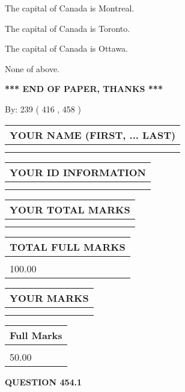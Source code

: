 \documentclass[12pt]{article}
\begin{document}
  
 
 
The capital of Canada is Montreal.
 
 
The capital of Canada is Toronto.
 
 
The capital of Canada is Ottawa.
 
 
 None of above.
 
 
   
   
\vspace{1.0in} 
{\textbf{\large{ *** END OF PAPER, THANKS *** }}} 
   
   
\hspace{1.0in} By: 
 239 ( 416 ,  458 )
   
   
   
   
\newpage 
\setcounter{page}{ 
   454001 } 
   
   
   
   
\noindent\begin{tabular}{|l|}
\hline
YOUR NAME (FIRST, ... LAST)  \\
\hline
 \\ 
 \\ 
\hline
\end{tabular}
\hspace{0.05in} \begin{tabular}{|l|}
\hline
 YOUR   ID   INFORMATION  \\
\hline
 \\ 
 \\ 
\hline
\end{tabular}
   
   
\vspace{0.2in}\noindent\begin{tabular}{|l|}
\hline
YOUR TOTAL MARKS  \\
\hline
 \\ 
 \\ 
\hline
\end{tabular}
\hspace{0.05in} \begin{tabular}{|l|}
\hline
TOTAL FULL MARKS  \\
\hline
 \\ 
100.00 \\
\hline
\end{tabular}
  
\vspace{0.2in}
  
\noindent\begin{tabular}{|l|}
\hline
 YOUR MARKS  \\
\hline
 \\ 
 \\ 
\hline
\end{tabular}
\hspace{0.05in} \begin{tabular}{|l|}
\hline
 Full Marks  \\
\hline
 \\ 
50.00 \\
\hline
\end{tabular}
{\textbf{\Large{QUESTION
454.1 
}}}
  
\end{document}
